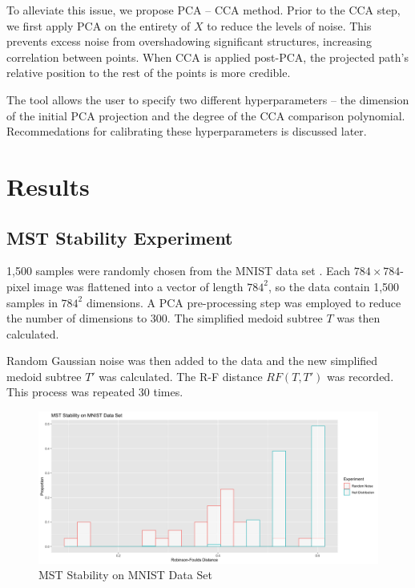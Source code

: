 \documentclass{article}
\begin{document}
To alleviate this issue, we propose PCA -- CCA method. Prior to the CCA step, we first apply PCA on the entirety of $X$ to reduce the levels of noise. This prevents excess noise from overshadowing significant structures, increasing correlation between points. When CCA is applied post-PCA, the projected path's relative position to the rest of the points is more credible.

The tool allows the user to specify two different hyperparameters -- the dimension of the initial PCA projection and the degree of the CCA comparison polynomial. Recommedations for calibrating these hyperparameters is discussed later.

\section{Results}

\subsection{MST Stability Experiment}
1,500 samples were randomly chosen from the MNIST data set \cite{MNIST}. Each $784 \times 784$-pixel image was flattened into a vector of length $784^2$, so the data contain 1,500 samples in $784^2$ dimensions. A PCA pre-processing step was employed to reduce the number of dimensions to 300. The simplified medoid subtree $T$ was then calculated.

Random Gaussian noise was then added to the data and the new simplified medoid subtree $T'$ was calculated. The R-F distance $RF(T, T')$ was recorded. This process was repeated 30 times.

\renewcommand{\figurename}{Figure}
\renewcommand{\thefigure}{1}
\begin{figure}[!b]
\centering
\includegraphics[scale=0.3]{RF stability}
\caption{MST Stability on MNIST Data Set}
\end{figure}
\end{document}
